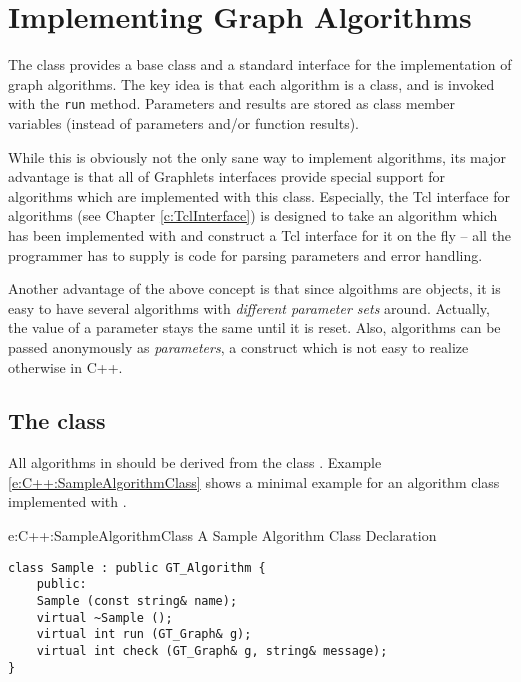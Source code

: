 \documentclass[twoside,fleqn]{report}
\begin{document}
%
%

\chapter{Implementing Graph Algorithms}
\label{c:Algorithms}


The class  provides a base class and a standard
interface for the implementation of graph algorithms. The key
idea is that each algorithm is a class, and is invoked with the
\texttt{run} method. Parameters and results are stored as class
member variables (instead of parameters and/or function results).

While this is obviously not the only sane way to implement
algorithms, its major advantage is that all of Graphlets
interfaces provide special support for algorithms which are
implemented with this class. Especially, the Tcl interface for
algorithms (see Chapter \ref{c:TclInterface}) is designed to
take an algorithm which has been implemented with 
and construct a Tcl interface for it on the fly -- all the
programmer has to supply is code for parsing parameters and error
handling.

Another advantage of the above concept is that since algoithms
are objects, it is easy to have several algorithms with
\emph{different parameter sets} around. Actually, the value of a
parameter stays the same until it is reset. Also, algorithms can
be passed anonymously as \emph{parameters}, a construct which is
not easy to realize otherwise in C++.


%
%

\section{The class }

All algorithms in \Graphlet{} should be derived from the class
. Example \ref{e:C++:SampleAlgorithmClass} shows a
minimal example for an algorithm class implemented with
.

\begin{example}%
{e:C++:SampleAlgorithmClass}%
{A Sample Algorithm Class Declaration}
\begin{verbatim}
class Sample : public GT_Algorithm {
    public:
    Sample (const string& name);
    virtual ~Sample ();
    virtual int run (GT_Graph& g);
    virtual int check (GT_Graph& g, string& message);
}
\end{verbatim}
\end{example}
\end{document}
